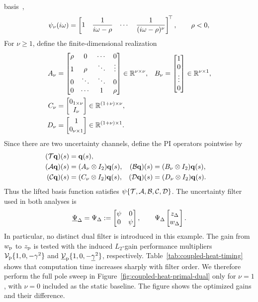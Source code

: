 basis~\cite[Eq.~(12a)]{veenman2016robust},
\begin{equation*}
 \psi_\nu(i\omega)=\begin{bmatrix}1&\dfrac{1}{i\omega-\rho}&\cdots&
 \dfrac{1}{(i\omega-\rho)^\nu}\end{bmatrix}^{\!\top},
 \qquad \rho<0,
\end{equation*}
For $\nu\geq1$, define the finite-dimensional realization
\begin{align*}
 A_\nu&=\begin{bmatrix}
  \rho&0&\cdots&0\\
  1&\rho&\ddots&\vdots\\
  0&\ddots&\ddots&0\\
  0&\cdots&1&\rho\end{bmatrix}\in\mathbb{R}^{\nu\times\nu},
 &B_\nu&=\begin{bmatrix}1\\0\\\vdots\\0\end{bmatrix}\in\mathbb{R}^{\nu\times 1},\\
 C_\nu&=\begin{bmatrix}0_{1\times\nu}\\I_\nu\end{bmatrix}\in\mathbb{R}^{(1+\nu)\times\nu},\\
 D_\nu&=\begin{bmatrix}1\\0_{\nu\times1}\end{bmatrix}\in\mathbb{R}^{(1+\nu)\times 1}.
\end{align*}
Since there are two uncertainty channels,
define the PI operators pointwise by
\begin{align*}
 (\mathcal{T}\mathbf{q})(s)&=\mathbf{q}(s),&\\
 (\mathcal{A}\mathbf{q})(s)&=(A_\nu\otimes I_2)\mathbf{q}(s),&(\mathcal{B}\mathbf{q})(s)&=(B_\nu\otimes I_2)\mathbf{q}(s),\\
 (\mathcal{C}\mathbf{q})(s)&=(C_\nu\otimes I_2)\mathbf{q}(s),&(\mathcal{D}\mathbf{q})(s)&=(D_\nu\otimes I_2)\mathbf{q}(s).
\end{align*}
Thus the lifted basis function satisfies ${\psi}\{\mathcal{T},\mathcal{A},\mathcal{B},\mathcal{C},\mathcal{D}\}$.  The uncertainty filter
used in both analyses is
\begin{equation}\label{eq:example-shared-filter}
 \underline{\Psi}_\Delta=\Psi_\Delta
 :=\begin{bmatrix}\psi&0\\0&\psi\end{bmatrix},\qquad \Psi_\Delta\begin{bmatrix}z_\Delta\\w_\Delta\end{bmatrix}.
\end{equation}
In particular, no distinct dual filter is introduced in this example. The
gain from $w_{{\mathrm{p}}}$
to $z_{{\mathrm{p}}}$ is tested with the induced $L_2$-gain performance multipliers
$\mathcal{V}_{{\mathrm{p}}}\{1,0,-\gamma^2\}$ and
$\underline{\mathcal{V}}_{{\mathrm{p}}}\{1,0,-\underline\gamma^2\}$, respectively.
Table~\ref{tab:coupled-heat-timing} shows that computation time increases
sharply with filter order.
We therefore perform the full pole sweep in
Figure~\ref{fig:coupled-heat-primal-dual} only for $\nu=1$, with $\nu=0$
included as the static baseline. The figure shows the optimized gains and
their difference.



